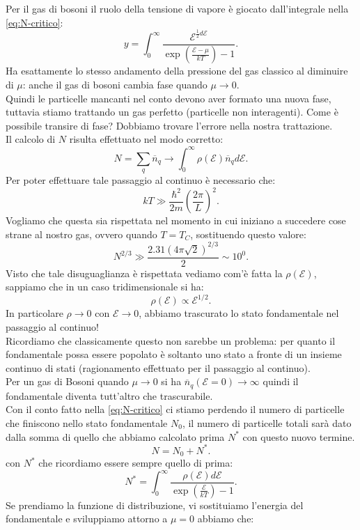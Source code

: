 \noindent
Per il gas di bosoni il ruolo della tensione di vapore è giocato dall'integrale nella \ref{eq:N-critico}:
\[
	y =\int_{0}^{\infty} \frac{\mathcal{E} ^{\frac{1}{2}d\mathcal{E} }}{\exp\left( \frac{\mathcal{E} -\mu }{kT} \right)-1 } 
.\] 
Ha esattamente lo stesso andamento della pressione del gas classico al diminuire di $\mu$: anche il gas di bosoni cambia fase quando $\mu \to 0$.\\
Quindi le particelle mancanti nel conto devono aver formato una nuova fase, tuttavia stiamo trattando un gas perfetto (particelle non interagenti). Come è possibile transire di fase? Dobbiamo trovare l'errore nella nostra trattazione.\\
Il calcolo di $N$ risulta effettuato nel modo corretto:
\[
    N = \sum_{q}^{} \overline{n}_{q} \to \int_{0}^{\infty} \rho (\mathcal{E}) \overline{n}_q d\mathcal{E}
.\] 
Per poter effettuare tale passaggio al continuo è necessario che:
\[
	kT \gg \frac{\hbar^2}{2m}\left( \frac{2\pi}{L} \right) ^2
.\]
Vogliamo che questa sia rispettata nel momento in cui iniziano a succedere cose strane al nostro gas, ovvero quando $T = T_{C}$, sostituendo questo valore:
\[
	N^{2 /3} \gg \frac{2.31 \left( 4\pi\sqrt{2}  \right)^{2 /3}}{2} \sim 10^0
.\] 
Visto che tale disuguaglianza è rispettata vediamo com'è fatta la $\rho ( \mathcal{E} ) $, sappiamo che in un caso tridimensionale si ha:
\[
	\rho ( \mathcal{E} ) \propto \mathcal{E} ^{1 /2}
.\] 
In particolare $\rho \to 0$ con $\mathcal{E} \to 0$, abbiamo trascurato lo stato fondamentale nel passaggio al continuo!\\
Ricordiamo che classicamente questo non sarebbe un problema: per quanto il fondamentale possa essere popolato è soltanto uno stato a fronte di un insieme continuo di stati (ragionamento effettuato per il passaggio al continuo). \\
Per un gas di Bosoni quando $\mu \to 0$ si ha $\overline{n}_{q}( \mathcal{E} = 0)  \to \infty$ quindi il fondamentale diventa tutt'altro che trascurabile.\\
Con il conto fatto nella \ref{eq:N-critico} ci stiamo perdendo il numero di particelle che finiscono nello stato fondamentale $N_0$, il numero di particelle totali sarà dato dalla somma di quello che abbiamo calcolato prima $N^{*}$ con questo nuovo termine.
\[
	N = N_0 + N^{*}
.\] 
con $N^{*}$ che ricordiamo essere sempre quello di prima:
\[
	N^{*} = \int_{0}^{\infty} 
	\frac{\rho( \mathcal{E} ) d\mathcal{E} }
	{\exp\left( \frac{\mathcal{E} }{kT} \right) -1} 
.\] 
Se prendiamo la funzione di distribuzione, vi sostituiamo l'energia del fondamentale e sviluppiamo attorno a $\mu = 0$ abbiamo che:
